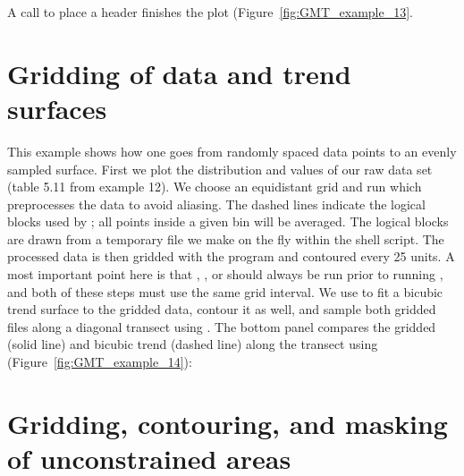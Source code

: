 A  call to place a header finishes the plot
(Figure~\ref{fig:GMT_example_13}.



\section{Gridding of data and trend surfaces}

This example shows how one goes from randomly spaced data
points to an evenly sampled surface.  First we plot the
distribution and values of our raw data set (table 5.11
from example 12).  We choose an equidistant grid and run
 which preprocesses the data to avoid aliasing.
The dashed lines indicate the logical blocks used by
; all points inside a given bin will be averaged.
The logical blocks are drawn from a temporary file we make on
the fly within the shell script.  The processed data is then
gridded with the  program and contoured every 25
units.  A most important point here is that ,
, or  should always be run
prior to running , and both of these steps must use the same
grid interval.  We use  to fit a bicubic trend
surface to the gridded data, contour it as well, and sample
both gridded files along a diagonal transect using .
The bottom panel compares the gridded (solid line) and bicubic
trend (dashed line) along the transect using 
(Figure~\ref{fig:GMT_example_14}):



\section{Gridding, contouring, and masking of unconstrained areas}

